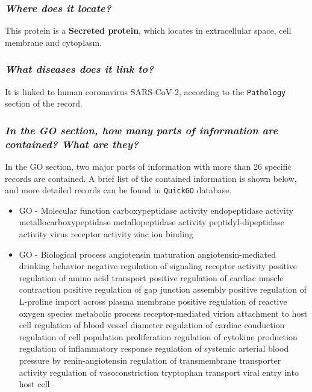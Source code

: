 \documentclass[en,black,11pt,normal]{elegantnote}
\begin{document}
\subsubsection{\textit{Where does it locate?}}
This protein is a \textbf{Secreted protein}, which locates in extracellular space, cell membrane and cytoplasm.

\subsubsection{\textit{What diseases does it link to?}}

It is linked to human coronavirus SARS-CoV-2, according to the \texttt{Pathology} section of the record.

\subsubsection{\textit{In the GO section, how many parts of information are contained? What are they?}}

In the GO section, two major parts of information with more than 26 specific records are contained.
A brief list of the contained information is shown below, and more detailed records can be found in \texttt{QuickGO} database.

\begin{itemize}
    \item GO - Molecular function
    \subitem carboxypeptidase activity
    \subitem endopeptidase activity
    \subitem metallocarboxypeptidase
    \subitem metallopeptidase activity
    \subitem peptidyl-dipeptidase activity
    \subitem virus receptor activity
    \subitem zinc ion binding
    \item GO - Biological process
    \subitem angiotensin maturation
    \subitem angiotensin-mediated drinking behavior
    \subitem negative regulation of signaling receptor activity
    \subitem positive regulation of amino acid transport
    \subitem positive regulation of cardiac muscle contraction
    \subitem positive regulation of gap junction assembly
    \subitem positive regulation of L-proline import across plasma membrane
    \subitem positive regulation of reactive oxygen species metabolic process
    \subitem receptor-mediated virion attachment to host cell
    \subitem regulation of blood vessel diameter
    \subitem regulation of cardiac conduction
    \subitem regulation of cell population proliferation
    \subitem regulation of cytokine production
    \subitem regulation of inflammatory response
    \subitem regulation of systemic arterial blood pressure by renin-angiotensin
    \subitem regulation of transmembrane transporter activity
    \subitem regulation of vasoconstriction
    \subitem tryptophan transport
    \subitem viral entry into host cell
\end{itemize}
\end{document}
